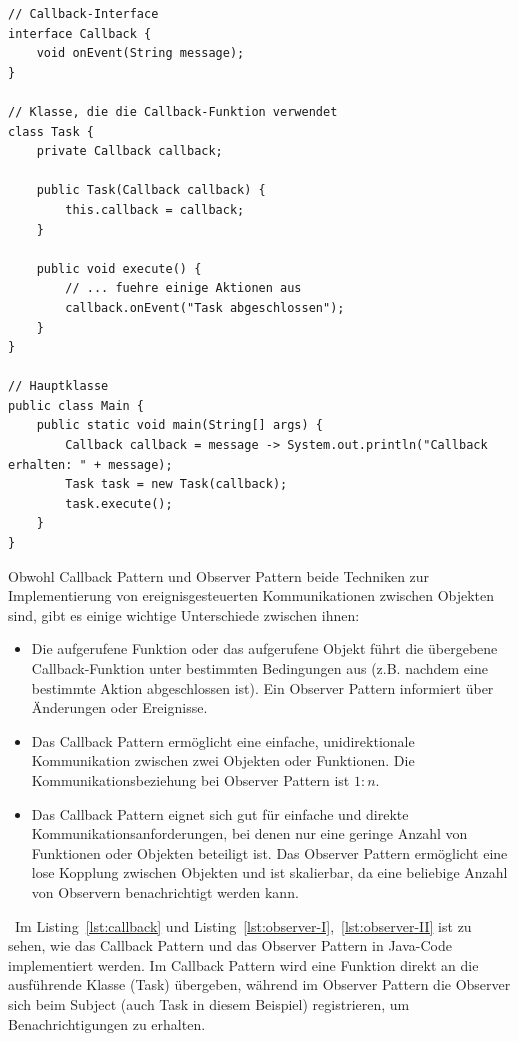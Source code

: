 \documentclass[../vs-script-first-v01.tex]{subfiles}
\begin{document}
\noindent\begin{minipage}{\textwidth}
\begin{lstlisting}[caption={Callback Pattern},captionpos=b,label={lst:callback}]
// Callback-Interface
interface Callback {
    void onEvent(String message);
}

// Klasse, die die Callback-Funktion verwendet
class Task {
    private Callback callback;

    public Task(Callback callback) {
        this.callback = callback;
    }

    public void execute() {
        // ... fuehre einige Aktionen aus
        callback.onEvent("Task abgeschlossen");
    }
}

// Hauptklasse
public class Main {
    public static void main(String[] args) {
        Callback callback = message -> System.out.println("Callback erhalten: " + message);
        Task task = new Task(callback);
        task.execute();
    }
}
\end{lstlisting}
\end{minipage}
Obwohl Callback Pattern und Observer Pattern beide Techniken zur Implementierung von ereignisgesteuerten Kommunikationen zwischen Objekten sind, gibt es einige wichtige Unterschiede zwischen ihnen:

\begin{itemize}
\item Die aufgerufene Funktion oder das aufgerufene Objekt führt die übergebene Callback-Funktion unter bestimmten Bedingungen aus (z.B. nachdem eine bestimmte Aktion abgeschlossen ist). Ein Observer Pattern informiert über Änderungen oder Ereignisse.
\item Das Callback Pattern ermöglicht eine einfache, unidirektionale Kommunikation zwischen zwei Objekten oder Funktionen. Die Kommunikationsbeziehung bei Observer Pattern ist $1:n$. 
\item Das Callback Pattern eignet sich gut für einfache und direkte Kommunikationsanforderungen, bei denen nur eine geringe Anzahl von Funktionen oder Objekten beteiligt ist. Das Observer Pattern ermöglicht eine lose Kopplung zwischen Objekten und ist skalierbar, da eine beliebige Anzahl von Observern benachrichtigt werden kann.
\end{itemize}\
Im Listing~\ref{lst:callback} und Listing~\ref{lst:observer-I},~\ref{lst:observer-II} ist zu sehen, wie das Callback Pattern und das Observer Pattern in Java-Code implementiert werden. Im Callback Pattern wird eine Funktion direkt an die ausführende Klasse (Task) übergeben, während im Observer Pattern die Observer sich beim Subject (auch Task in diesem Beispiel) registrieren, um Benachrichtigungen zu erhalten.
\end{document}

